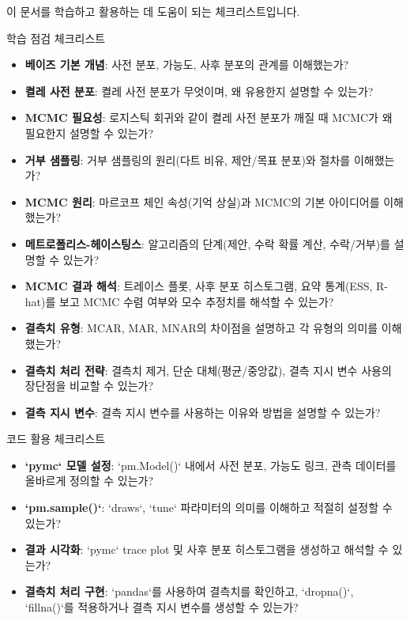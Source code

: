 \documentclass[11pt,a4paper]{article}
\begin{document}
이 문서를 학습하고 활용하는 데 도움이 되는 체크리스트입니다.

\begin{mybox}{학습 점검 체크리스트}
\begin{itemize}
    \item \textbf{베이즈 기본 개념}: 사전 분포, 가능도, 사후 분포의 관계를 이해했는가?
    \item \textbf{켤레 사전 분포}: 켤레 사전 분포가 무엇이며, 왜 유용한지 설명할 수 있는가?
    \item \textbf{MCMC 필요성}: 로지스틱 회귀와 같이 켤레 사전 분포가 깨질 때 MCMC가 왜 필요한지 설명할 수 있는가?
    \item \textbf{거부 샘플링}: 거부 샘플링의 원리(다트 비유, 제안/목표 분포)와 절차를 이해했는가?
    \item \textbf{MCMC 원리}: 마르코프 체인 속성(기억 상실)과 MCMC의 기본 아이디어를 이해했는가?
    \item \textbf{메트로폴리스-헤이스팅스}: 알고리즘의 단계(제안, 수락 확률 계산, 수락/거부)를 설명할 수 있는가?
    \item \textbf{MCMC 결과 해석}: 트레이스 플롯, 사후 분포 히스토그램, 요약 통계(ESS, R-hat)를 보고 MCMC 수렴 여부와 모수 추정치를 해석할 수 있는가?
    \item \textbf{결측치 유형}: MCAR, MAR, MNAR의 차이점을 설명하고 각 유형의 의미를 이해했는가?
    \item \textbf{결측치 처리 전략}: 결측치 제거, 단순 대체(평균/중앙값), 결측 지시 변수 사용의 장단점을 비교할 수 있는가?
    \item \textbf{결측 지시 변수}: 결측 지시 변수를 사용하는 이유와 방법을 설명할 수 있는가?
\end{itemize}
\end{mybox}

\begin{mybox}{코드 활용 체크리스트}
\begin{itemize}
    \item \textbf{`pymc` 모델 설정}: `pm.Model()` 내에서 사전 분포, 가능도 링크, 관측 데이터를 올바르게 정의할 수 있는가?
    \item \textbf{`pm.sample()`}: `draws`, `tune` 파라미터의 의미를 이해하고 적절히 설정할 수 있는가?
    \item \textbf{결과 시각화}: `pymc` trace plot 및 사후 분포 히스토그램을 생성하고 해석할 수 있는가?
    \item \textbf{결측치 처리 구현}: `pandas`를 사용하여 결측치를 확인하고, `dropna()`, `fillna()`를 적용하거나 결측 지시 변수를 생성할 수 있는가?
\end{itemize}
\end{mybox}
\end{document}
